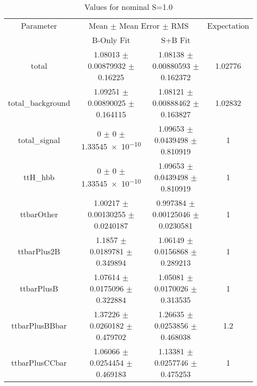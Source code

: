 \begin{table}
\centering
\caption{Values for nominal S=1.0}
\begin{tabular}{cccc}
\toprule
Parameter & \multicolumn{2}{c}{Mean $\pm$ Mean Error $\pm$ RMS} & Expectation\\
 & B-Only Fit & S+B Fit & \\
\midrule
total & \num{1.08013} $\pm$ \num{0.00879932} $\pm$ \num{0.16225} & \num{1.08138} $\pm$ \num{0.00880593} $\pm$ \num{0.162372} & \num{1.02776}\\
total\_background & \num{1.09251} $\pm$ \num{0.00890025} $\pm$ \num{0.164115} & \num{1.08121} $\pm$ \num{0.00888462} $\pm$ \num{0.163827} & \num{1.02832}\\
total\_signal & \num{0} $\pm$ \num{0} $\pm$ \num{1.33545e-10} & \num{1.09653} $\pm$ \num{0.0439498} $\pm$ \num{0.810919} & \num{1}\\
ttH\_hbb & \num{0} $\pm$ \num{0} $\pm$ \num{1.33545e-10} & \num{1.09653} $\pm$ \num{0.0439498} $\pm$ \num{0.810919} & \num{1}\\
ttbarOther & \num{1.00217} $\pm$ \num{0.00130255} $\pm$ \num{0.0240187} & \num{0.997384} $\pm$ \num{0.00125046} $\pm$ \num{0.0230581} & \num{1}\\
ttbarPlus2B & \num{1.1857} $\pm$ \num{0.0189781} $\pm$ \num{0.349894} & \num{1.06149} $\pm$ \num{0.0156868} $\pm$ \num{0.289213} & \num{1}\\
ttbarPlusB & \num{1.07614} $\pm$ \num{0.0175096} $\pm$ \num{0.322884} & \num{1.05081} $\pm$ \num{0.0170026} $\pm$ \num{0.313535} & \num{1}\\
ttbarPlusBBbar & \num{1.37226} $\pm$ \num{0.0260182} $\pm$ \num{0.479702} & \num{1.26635} $\pm$ \num{0.0253856} $\pm$ \num{0.468038} & \num{1.2}\\
ttbarPlusCCbar & \num{1.06066} $\pm$ \num{0.0254454} $\pm$ \num{0.469183} & \num{1.13381} $\pm$ \num{0.0257746} $\pm$ \num{0.475253} & \num{1}\\
\bottomrule
\end{tabular}
\end{table}